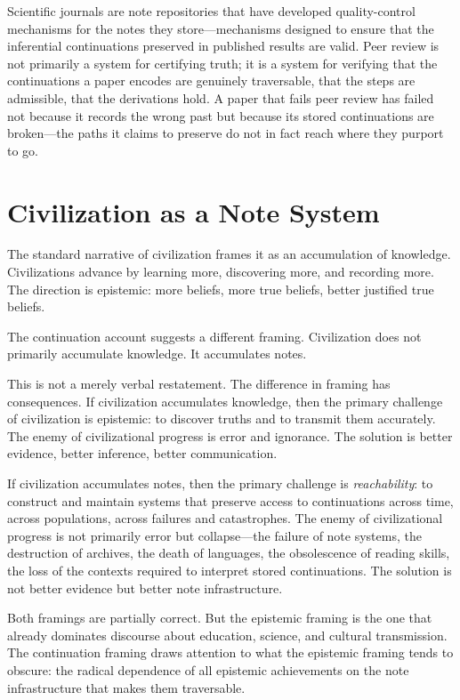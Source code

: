 \documentclass[12pt, a4paper]{article}
\begin{document}
Scientific journals are note repositories that have developed quality-control
mechanisms for the notes they store---mechanisms designed to ensure that the
inferential continuations preserved in published results are valid. Peer review is
not primarily a system for certifying truth; it is a system for verifying that the
continuations a paper encodes are genuinely traversable, that the steps are
admissible, that the derivations hold. A paper that fails peer review has failed
not because it records the wrong past but because its stored continuations are
broken---the paths it claims to preserve do not in fact reach where they purport
to go.

\section{Civilization as a Note System}

The standard narrative of civilization frames it as an accumulation of knowledge.
Civilizations advance by learning more, discovering more, and recording more. The
direction is epistemic: more beliefs, more true beliefs, better justified true
beliefs.

The continuation account suggests a different framing. Civilization does not
primarily accumulate knowledge. It accumulates notes.

This is not a merely verbal restatement. The difference in framing has
consequences. If civilization accumulates knowledge, then the primary challenge of
civilization is epistemic: to discover truths and to transmit them accurately. The
enemy of civilizational progress is error and ignorance. The solution is better
evidence, better inference, better communication.

If civilization accumulates notes, then the primary challenge is
\emph{reachability}: to construct and maintain systems that preserve access to
continuations across time, across populations, across failures and catastrophes.
The enemy of civilizational progress is not primarily error but collapse---the
failure of note systems, the destruction of archives, the death of languages, the
obsolescence of reading skills, the loss of the contexts required to interpret
stored continuations. The solution is not better evidence but better note
infrastructure.

Both framings are partially correct. But the epistemic framing is the one that
already dominates discourse about education, science, and cultural transmission.
The continuation framing draws attention to what the epistemic framing tends to
obscure: the radical dependence of all epistemic achievements on the note
infrastructure that makes them traversable.
\end{document}
